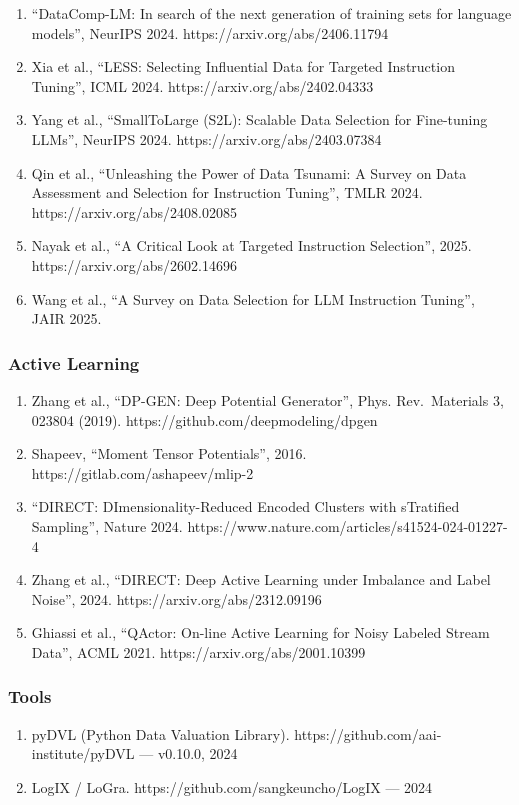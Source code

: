 \documentclass[
  12pt,
]{article}
\providecommand{\tightlist}{%
  \setlength{\itemsep}{0pt}\setlength{\parskip}{0pt}}
\begin{document}
\begin{enumerate}
\def\labelenumi{\arabic{enumi}.}
\setcounter{enumi}{12}
\tightlist
\item
  ``DataComp-LM: In search of the next generation of training sets for
  language models'', NeurIPS 2024. https://arxiv.org/abs/2406.11794
\item
  Xia et al., ``LESS: Selecting Influential Data for Targeted
  Instruction Tuning'', ICML 2024. https://arxiv.org/abs/2402.04333
\item
  Yang et al., ``SmallToLarge (S2L): Scalable Data Selection for
  Fine-tuning LLMs'', NeurIPS 2024. https://arxiv.org/abs/2403.07384
\item
  Qin et al., ``Unleashing the Power of Data Tsunami: A Survey on Data
  Assessment and Selection for Instruction Tuning'', TMLR 2024.
  https://arxiv.org/abs/2408.02085
\item
  Nayak et al., ``A Critical Look at Targeted Instruction Selection'',
  2025. https://arxiv.org/abs/2602.14696
\item
  Wang et al., ``A Survey on Data Selection for LLM Instruction
  Tuning'', JAIR 2025.
\end{enumerate}

\subsubsection{Active Learning}\label{active-learning}

\begin{enumerate}
\def\labelenumi{\arabic{enumi}.}
\setcounter{enumi}{18}
\tightlist
\item
  Zhang et al., ``DP-GEN: Deep Potential Generator'', Phys.
  Rev.~Materials 3, 023804 (2019). https://github.com/deepmodeling/dpgen
\item
  Shapeev, ``Moment Tensor Potentials'', 2016.
  https://gitlab.com/ashapeev/mlip-2
\item
  ``DIRECT: DImensionality-Reduced Encoded Clusters with sTratified
  Sampling'', Nature 2024.
  https://www.nature.com/articles/s41524-024-01227-4
\item
  Zhang et al., ``DIRECT: Deep Active Learning under Imbalance and Label
  Noise'', 2024. https://arxiv.org/abs/2312.09196
\item
  Ghiassi et al., ``QActor: On-line Active Learning for Noisy Labeled
  Stream Data'', ACML 2021. https://arxiv.org/abs/2001.10399
\end{enumerate}

\subsubsection{Tools}\label{tools}

\begin{enumerate}
\def\labelenumi{\arabic{enumi}.}
\setcounter{enumi}{23}
\tightlist
\item
  pyDVL (Python Data Valuation Library).
  https://github.com/aai-institute/pyDVL --- v0.10.0, 2024
\item
  LogIX / LoGra. https://github.com/sangkeuncho/LogIX --- 2024
\end{enumerate}
\end{document}
